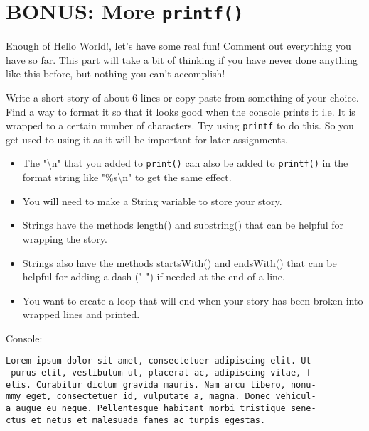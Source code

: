 \documentclass{report}
\begin{document}
\section{BONUS: More \texttt{printf()}}

Enough of Hello World!, let's have some real fun! Comment out everything you have so far. This part will take a bit of thinking if you have never done anything like this before, but nothing you can't accomplish!

Write a short story of about 6 lines or copy paste from something of your choice. Find a way to format it so that it looks good when the console prints it i.e. It is wrapped to a certain number of characters. Try using \texttt{printf} to do this. So you get used to using it as it will be important for later assignments.

\begin{itemize}
\item The "\textbackslash n" that you added to \texttt{print()} can also be added to \texttt{printf()} in the format string like "\%s\textbackslash n" to get the same effect.
\item You will need to make a String variable to store your story.
\item Strings have the methods length() and substring() that can be helpful for wrapping the story.
\item Strings also have the methods startsWith() and endsWith() that can be helpful for adding a dash ("-") if needed at the end of a line.
\item You want to create a loop that will end when your story has been broken into wrapped lines and printed.
\end{itemize}

Console:
\begin{lstlisting}
Lorem ipsum dolor sit amet, consectetuer adipiscing elit. Ut
 purus elit, vestibulum ut, placerat ac, adipiscing vitae, f-
elis. Curabitur dictum gravida mauris. Nam arcu libero, nonu-
mmy eget, consectetuer id, vulputate a, magna. Donec vehicul-
a augue eu neque. Pellentesque habitant morbi tristique sene-
ctus et netus et malesuada fames ac turpis egestas.
\end{lstlisting}
\end{document}
